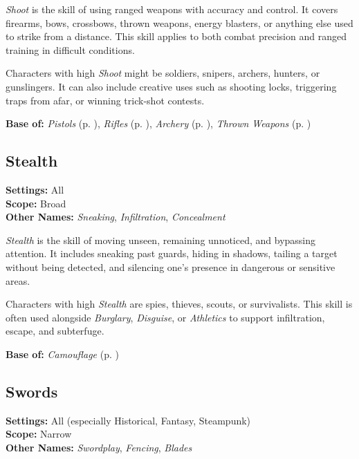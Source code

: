 \emph{Shoot} is the skill of using ranged weapons with accuracy and control. It covers firearms, bows, crossbows, thrown weapons, energy blasters, or anything else used to strike from a distance. This skill applies to both combat precision and ranged training in difficult conditions.

Characters with high \emph{Shoot} might be soldiers, snipers, archers, hunters, or gunslingers. It can also include creative uses such as shooting locks, triggering traps from afar, or winning trick-shot contests.

\vspace{0.5\baselineskip}
\noindent\textbf{Base of:} \emph{Pistols} (p. \pageref{skill:pistols}), \emph{Rifles} (p. \pageref{skill:rifles}), \emph{Archery} (p. \pageref{skill:archery}), \emph{Thrown Weapons} (p. \pageref{skill:thrown-weapons})



\subsection{Stealth}\label{skill:stealth}
\textbf{Settings:} All\\
\textbf{Scope:} Broad\\
\textbf{Other Names:} \emph{Sneaking}, \emph{Infiltration}, \emph{Concealment}\\
\vspace{\baselineskip}

\emph{Stealth} is the skill of moving unseen, remaining unnoticed, and bypassing attention. It includes sneaking past guards, hiding in shadows, tailing a target without being detected, and silencing one's presence in dangerous or sensitive areas.

Characters with high \emph{Stealth} are spies, thieves, scouts, or survivalists. This skill is often used alongside \emph{Burglary}, \emph{Disguise}, or \emph{Athletics} to support infiltration, escape, and subterfuge.

\vspace{0.5\baselineskip}
\noindent\textbf{Base of:} \emph{Camouflage} (p. \pageref{skill:camouflage})



\subsection{Swords}\label{skill:swords}
\textbf{Settings:} All (especially Historical, Fantasy, Steampunk)\\
\textbf{Scope:} Narrow\\
\textbf{Other Names:} \emph{Swordplay}, \emph{Fencing}, \emph{Blades}\\
\vspace{\baselineskip}

